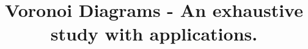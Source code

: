\documentclass[conference]{IEEEtran}
\begin{document}
%
\title{Voronoi Diagrams - An exhaustive study with applications.}



%
\end{document}
